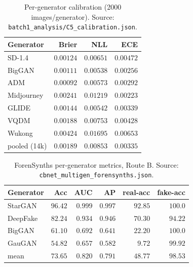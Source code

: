 \begin{table}[h]
  \centering
  \caption{Per-generator calibration (2000 images/generator). Source:
    \texttt{batch1\_analysis/C5\_calibration.json}.}
  \label{tab:calib}
  \small
  \begin{tabular}{lrrr}
    \toprule
    Generator & Brier & NLL & ECE \\
    \midrule
    SD-1.4     & $0.00124$ & $0.00651$ & $0.00472$ \\
    BigGAN     & $0.00111$ & $0.00538$ & $0.00256$ \\
    ADM        & $0.00092$ & $0.00573$ & $0.00292$ \\
    Midjourney & $0.00241$ & $0.01219$ & $0.00223$ \\
    GLIDE      & $0.00144$ & $0.00542$ & $0.00339$ \\
    VQDM       & $0.00188$ & $0.00753$ & $0.00428$ \\
    Wukong     & $0.00424$ & $0.01695$ & $0.00653$ \\
    \midrule
    pooled (14k) & $0.00189$ & $0.00853$ & $\mathbf{0.00335}$ \\
    \bottomrule
  \end{tabular}
\end{table}

\begin{table}[h]
  \centering
  \caption{ForenSynths per-generator metrics, Route B. Source:
    \texttt{cbnet\_multigen\_forensynths.json}.}
  \label{tab:forensynths-full}
  \small
  \begin{tabular}{lrrrrr}
    \toprule
    Generator & Acc & AUC & AP & real-acc & fake-acc \\
    \midrule
    StarGAN  & $96.42$ & $0.999$ & $0.997$ & $92.85$ & $100.0$ \\
    DeepFake & $82.24$ & $0.934$ & $0.946$ & $70.30$ & $94.22$ \\
    BigGAN   & $61.10$ & $0.692$ & $0.641$ & $22.20$ & $100.0$ \\
    GauGAN   & $54.82$ & $0.657$ & $0.582$ & $9.72$  & $99.92$ \\
    \midrule
    mean     & $73.65$ & $0.820$ & $0.791$ & $48.77$ & $98.53$ \\
    \bottomrule
  \end{tabular}
\end{table}

